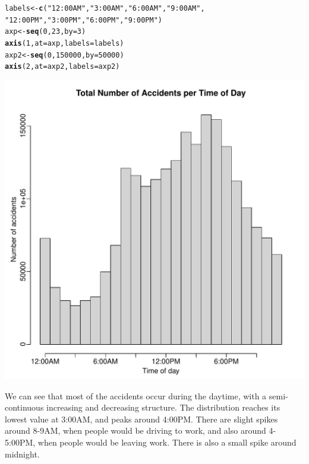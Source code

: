 \documentclass[10pt]{article}\usepackage[]{graphicx}\usepackage[]{xcolor}
\makeatletter
\def\maxwidth{ %
  \ifdim\Gin@nat@width>\linewidth
    \linewidth
  \else
    \Gin@nat@width
  \fi
}
\newcommand{\hlnum}[1]{\textcolor[rgb]{0.686,0.059,0.569}{#1}}%
\newcommand{\hlsng}[1]{\textcolor[rgb]{0.192,0.494,0.8}{#1}}%
\newcommand{\hldef}[1]{\textcolor[rgb]{0.345,0.345,0.345}{#1}}%
\newcommand{\hlkwb}[1]{\textcolor[rgb]{0.69,0.353,0.396}{#1}}%
\newcommand{\hlkwc}[1]{\textcolor[rgb]{0.333,0.667,0.333}{#1}}%
\newcommand{\hlkwd}[1]{\textcolor[rgb]{0.737,0.353,0.396}{\textbf{#1}}}%
\newenvironment{kframe}{%
 \def\at@end@of@kframe{}%
 \ifinner\ifhmode%
  \def\at@end@of@kframe{\end{minipage}}%
  \begin{minipage}{\columnwidth}%
 \fi\fi%
 \def\FrameCommand##1{\hskip\@totalleftmargin \hskip-\fboxsep
 \colorbox{shadecolor}{##1}\hskip-\fboxsep
     \hskip-\linewidth \hskip-\@totalleftmargin \hskip\columnwidth}%
 \MakeFramed {\advance\hsize-\width
   \@totalleftmargin\z@ \linewidth\hsize
   \@setminipage}}%
 {\par\unskip\endMakeFramed%
 \at@end@of@kframe}
\newenvironment{knitrout}{}{} %
\makeatother
\begin{document}
\begin{knitrout}
\begin{kframe}
\begin{alltt}
\hldef{labels} \hlkwb{<-} \hlkwd{c}\hldef{(}\hlsng{"12:00AM"}\hldef{,} \hlsng{"3:00AM"}\hldef{,} \hlsng{"6:00AM"}\hldef{,} \hlsng{"9:00AM"}\hldef{,}
             \hlsng{"12:00PM"}\hldef{,} \hlsng{"3:00PM"}\hldef{,} \hlsng{"6:00PM"}\hldef{,} \hlsng{"9:00PM"}\hldef{)}
\hldef{axp} \hlkwb{<-} \hlkwd{seq}\hldef{(}\hlnum{0}\hldef{,} \hlnum{23}\hldef{,} \hlkwc{by}\hldef{=}\hlnum{3}\hldef{)}
\hlkwd{axis}\hldef{(}\hlnum{1}\hldef{,} \hlkwc{at}\hldef{=axp,} \hlkwc{labels} \hldef{= labels)}
\hldef{axp2} \hlkwb{<-} \hlkwd{seq}\hldef{(}\hlnum{0}\hldef{,} \hlnum{150000}\hldef{,} \hlkwc{by}\hldef{=}\hlnum{50000}\hldef{)}
\hlkwd{axis}\hldef{(}\hlnum{2}\hldef{,} \hlkwc{at} \hldef{= axp2,} \hlkwc{labels} \hldef{= axp2)}
\end{alltt}
\end{kframe}
\includegraphics[width=\maxwidth]{figure/unnamed-chunk-5-2} 
\end{knitrout}

We can see that most of the accidents occur during the daytime, with a semi-continuous increasing and decreasing structure. The distribution reaches its lowest value at 3:00AM, and peaks around 4:00PM. There are slight spikes around 8-9AM, when people would be driving to work, and also around 4-5:00PM, when people would be leaving work. There is also a small spike around midnight.
\end{document}
